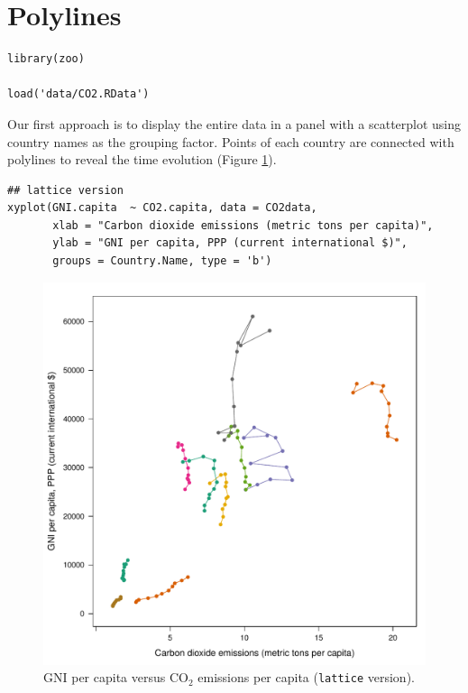 
\section{Polylines}
\label{sec:org58f67f4}
\lstset{language=r,label= ,caption= ,captionpos=b,numbers=none}
\begin{lstlisting}
library(zoo)

load('data/CO2.RData')
\end{lstlisting}




Our first approach is to display the entire data in a panel with a
scatterplot using country names as the grouping factor. Points of each
country are connected with polylines to reveal the time evolution
(Figure \ref{fig:CO2-GNI}).
\lstset{language=r,label= ,caption= ,captionpos=b,numbers=none}
\begin{lstlisting}
## lattice version
xyplot(GNI.capita  ~ CO2.capita, data = CO2data,
       xlab = "Carbon dioxide emissions (metric tons per capita)",
       ylab = "GNI per capita, PPP (current international $)",
       groups = Country.Name, type = 'b')
\end{lstlisting}

\begin{figure}[htbp]
\centering
\includegraphics[width=.9\linewidth]{figs/CO2_GNI.pdf}
\caption{GNI per capita versus \(\mathrm{CO_2}\) emissions per capita (\texttt{lattice} version). \label{fig:CO2-GNI}}
\end{figure}

